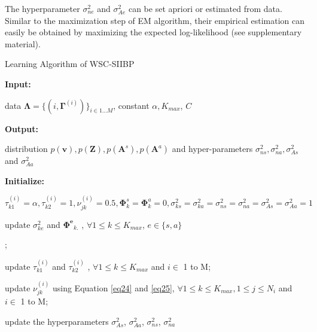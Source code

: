 \documentclass[runningheads]{llncs}
\begin{document}
The hyperparameter $\sigma_{ne}^2$ and $\sigma_{Ae}^2$ can be set apriori or estimated from data. Similar to the maximization step of EM algorithm, their empirical estimation can easily be obtained by maximizing the expected log-likelihood (see supplementary material). 

\begin{algorithm}[!htp]
\caption{Learning Algorithm of WSC-SIIBP}
\label{inference}
\begin{algorithmic}[1]
\State \textbf{Input:} \parbox[t]{\dimexpr\linewidth-\algorithmicindent}{data $\mathbf{\Lambda} = \lbrace (i, \mathbf{\Gamma}^{(i)})\rbrace_{i\in 1\dots M}$, constant $\alpha, K_{max}$, $C$\strut}
\State \textbf{Output:} \parbox[t]{\dimexpr\linewidth-\algorithmicindent}{distribution $p(\mathbf{v}), p(\mathbf{Z}), p(\mathbf{A}^s), p(\mathbf{A}^a)$ and hyper-parameters $\sigma_{ns}^2, \sigma_{na}^2, \sigma_{As}^2$ and $\sigma_{Aa}^2$\strut}
\State \textbf{Initialize:} \parbox[t]{\dimexpr\linewidth-\algorithmicindent}{$\tau_{k1}^{(i)} = \alpha, \tau_{k2}^{(i)} = 1, \nu_{jk}^{(i)} = 0.5, \mathbf{\Phi}_k^s = \mathbf{\Phi}_k^a = 0, \sigma_{ks}^2 = \sigma_{ka}^2 = \sigma_{ns}^2 = \sigma_{na}^2 = \sigma_{As}^2  = \sigma_{Aa}^2 = 1$\strut}
\Repeat
\Repeat
\State \parbox[t]{\dimexpr\linewidth-\algorithmicindent}{update $\sigma_{ke}^2$ and $\mathbf{\Phi^e}_{k.}$ %
, $\forall 1\leq k \leq K_{max}$, $e \in \{s,a\}$\strut;}
\State \parbox[t]{\dimexpr\linewidth-\algorithmicindent}{update $\tau_{k1}^{(i)}$ and $\tau_{k2}^{(i)}$ %
, $\forall 1\leq k \leq K_{max}$ and $i\in$ 1 to M;\strut}
\State \parbox[t]{\dimexpr\linewidth-\algorithmicindent}{update $\nu_{jk}^{(i)}$ using Equation \eqref{eq24} and \eqref{eq25}, $\forall 1\leq k \leq K_{max}, 1\leq j \leq N_i$ and $i\in$ 1 to M;\strut}
\State \parbox[t]{\dimexpr\linewidth-\algorithmicindent}{update the hyperparameters $\sigma_{As}^2$, $\sigma_{Aa}^2$, $\sigma_{ns}^2$, $\sigma_{na}^2$ \strut}
\end{algorithmic}
\end{algorithm}
\end{document}
